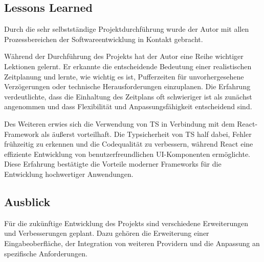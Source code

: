 \subsection{Lessons Learned}
\label{sec:LessonsLearned}
Durch die sehr selbstständige Projektdurchführung wurde der Autor mit allen Prozessbereichen
der Softwareentwicklung in Kontakt gebracht.


Während der Durchführung des Projekts hat der Autor eine Reihe wichtiger Lektionen gelernt.
Er erkannte die entscheidende Bedeutung einer realistischen Zeitplanung und lernte, wie wichtig es ist, Pufferzeiten für unvorhergesehene Verzögerungen oder technische Herausforderungen einzuplanen.
Die Erfahrung verdeutlichte, dass die Einhaltung des Zeitplans oft schwieriger ist als zunächst angenommen und dass Flexibilität und Anpassungsfähigkeit entscheidend sind.


Des Weiteren erwies sich die Verwendung von \ac{TS} in Verbindung mit dem React-Framework als äußerst vorteilhaft.
Die Typsicherheit von \ac{TS} half dabei, Fehler frühzeitig zu erkennen und die Codequalität zu verbessern, während React eine effiziente Entwicklung von benutzerfreundlichen \ac{UI}-Komponenten ermöglichte.
Diese Erfahrung bestätigte die Vorteile moderner Frameworks für die Entwicklung hochwertiger Anwendungen.

\subsection{Ausblick}
\label{sec:Ausblick}


Für die zukünftige Entwicklung des Projekts sind verschiedene Erweiterungen und Verbesserungen geplant.
Dazu gehören die Erweiterung einer Eingabeoberfläche, der Integration von weiteren Providern und die Anpassung an spezifische Anforderungen.
